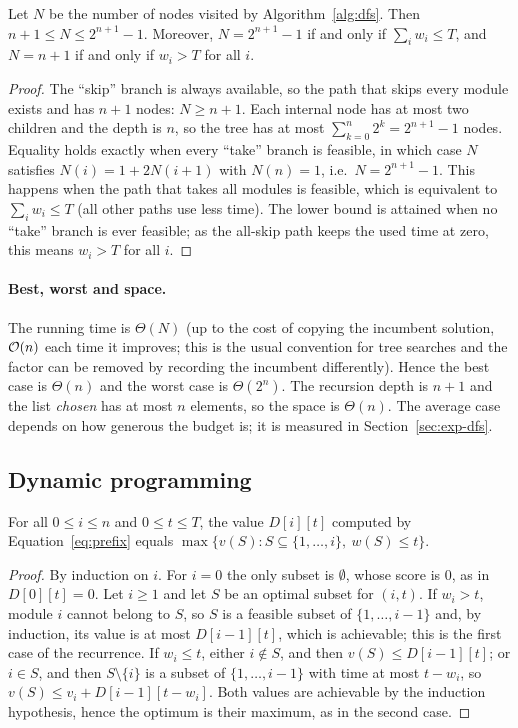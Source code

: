 \begin{proposition}\label{prop:dfs-nodes}
Let $N$ be the number of nodes visited by Algorithm~\ref{alg:dfs}. Then $n+1\le N\le 2^{n+1}-1$. Moreover, $N=2^{n+1}-1$ if and only if $\sum_i w_i\le T$, and $N=n+1$ if and only if $w_i>T$ for all $i$.
\end{proposition}
\begin{proof}
The ``skip'' branch is always available, so the path that skips every module exists and has $n+1$ nodes: $N\ge n+1$. Each internal node has at most two children and the depth is $n$, so the tree has at most $\sum_{k=0}^{n}2^k=2^{n+1}-1$ nodes. Equality holds exactly when every ``take'' branch is feasible, in which case $N$ satisfies $N(i)=1+2N(i+1)$ with $N(n)=1$, i.e.\ $N=2^{n+1}-1$. This happens when the path that takes all modules is feasible, which is equivalent to $\sum_i w_i\le T$ (all other paths use less time). The lower bound is attained when no ``take'' branch is ever feasible; as the all-skip path keeps the used time at zero, this means $w_i>T$ for all $i$.
\end{proof}

\paragraph{Best, worst and space.} The running time is $\Theta(N)$ (up to the cost of copying the incumbent solution, $\mathcal{O}(n)$ each time it improves; this is the usual convention for tree searches and the factor can be removed by recording the incumbent differently). Hence the best case is $\Theta(n)$ and the worst case is $\Theta(2^n)$. The recursion depth is $n+1$ and the list \emph{chosen} has at most $n$ elements, so the space is $\Theta(n)$. The average case depends on how generous the budget is; it is measured in Section~\ref{sec:exp-dfs}.

\subsection{Dynamic programming}

\begin{lemma}[Recurrence]\label{lem:rec}
For all $0\le i\le n$ and $0\le t\le T$, the value $D[i][t]$ computed by Equation~\eqref{eq:prefix} equals $\max\{v(S): S\subseteq\{1,\dots,i\},\ w(S)\le t\}$.
\end{lemma}
\begin{proof}
By induction on $i$. For $i=0$ the only subset is $\emptyset$, whose score is 0, as in $D[0][t]=0$. Let $i\ge1$ and let $S$ be an optimal subset for $(i,t)$. If $w_i>t$, module $i$ cannot belong to $S$, so $S$ is a feasible subset of $\{1,\dots,i-1\}$ and, by induction, its value is at most $D[i-1][t]$, which is achievable; this is the first case of the recurrence. If $w_i\le t$, either $i\notin S$, and then $v(S)\le D[i-1][t]$; or $i\in S$, and then $S\setminus\{i\}$ is a subset of $\{1,\dots,i-1\}$ with time at most $t-w_i$, so $v(S)\le v_i+D[i-1][t-w_i]$. Both values are achievable by the induction hypothesis, hence the optimum is their maximum, as in the second case.
\end{proof}

